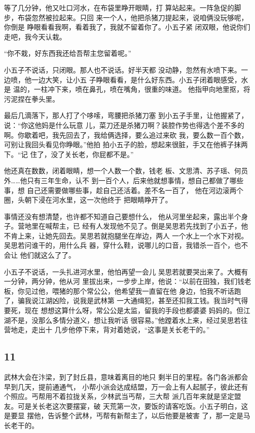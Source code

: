 等了几分钟，他又吐口河水，在布袋里睁开眼睛，打
算站起来。一阵急促的脚步，布袋忽然被拉起来。只回
来一个人，他把杀猪刀提起来，说咱俩没玩够呢，你倒是
睁眼看看我啊，看着我了，我就不留着你了。小五子紧
闭双眼，他说你们走吧，我今天认栽。

“你不栽，好东西我还给吾帮主您留着呢。”

小五子不说话，只闭眼。那人也不说话。好半天都
没动静，忽然有水喷下来。一边喷，他一边大笑，让小五
子睁眼看看，是什么好东西。小五子闭着眼感受，水是
温的，一柱冲下来，喷在鼻孔，喷在嘴角，很重的味道。
他指甲向地里抠，将污泥捏在拳头里。

最后几滴落下，那人打了个哆嗦，弯腰把杀猪刀塞
到小五子手里，让他握紧了，说：“你这他妈是什么玩意
儿，菜刀还是杀猪刀啊？装腔作势也得选个差不多的
啊。你歇着吧，我先回去了，我给俩选择，要么追过来砍
我，要么数一百个数，可别让我回头看见你睁眼。”他拍
拍小五子的脸，想起来很脏，手又在他裤子抹两下。“记
住了，没了关长老，你屁都不是。”

他还真在数数，闭着眼睛，想一个人数一个数，钱老
板、文思清、苏子瑶、何员外……他只有三年生命，认不
到一百个人，后来他就想事情，想自己都做了哪些事，想
自己还需要做哪些事，趁自己还活着。差不名一百了，
他在河边滚两个圈，头朝下浸在河水里，这一次他终于
把眼睛睁开了。

事情还没有想清楚，也许都不知道自己要想什么，
他从河里坐起来，露出半个身子。营地里在喊帮主，已
经有人发现他不见了。倒是吴思若先找到了小五子，他
不肯上来，让她先回去。吴思若就抱腿坐在岸边，两人
一个水上一个水下对视。吴思若问谁干的，用什么兵
器，穿什么鞋，说哪儿的口音，我错杀一百个，也不会让
他们就这么了了。

小五子不说话，一头扎进河水里，他怕再望一会儿
吴思若就要哭出来了。大概有一分钟，两分钟，他从河
里拔出来，一步步上岸，他说：“以前在田独，我们钱老
板，你见过他，喂猪的那个常公公，他希望我一直留在他
身边，怕我不听话跑了，骗我说江湖凶险，说我是武林第
一大通缉犯，甚至还扣我工钱。我当时气得要死，现在
想想这算什么呀，常公公是太监，留我的手段也都婆婆
妈妈的。但江湖不是，没那么多情分道义，想让我听话
很容易。”他蹚着水上来，经过吴思若往营地走，走出十
几步他停下来，背对着她说，“这事是关长老干的。”
\newline

{\centering\subsection{11}}

武林大会在汴梁，到了封丘县，意味着离目的地只
剩半日的里程。各门各派都会早到几天，提前通通气，
小帮小派会达成结盟，万一会上有人起腻子，彼此还有
个照应。丐帮用不着拉拢关系，少林武当丐帮，三大帮
派几百年来就是坚定盟友。可是关长老这次要摆宴，破
天荒第一次，要饭的请客吃饭。小五子明白，这是要显
摆他，告诉整个武林，丐帮有新帮主了，以后他要是被害
了，那一定是马长老干的。

